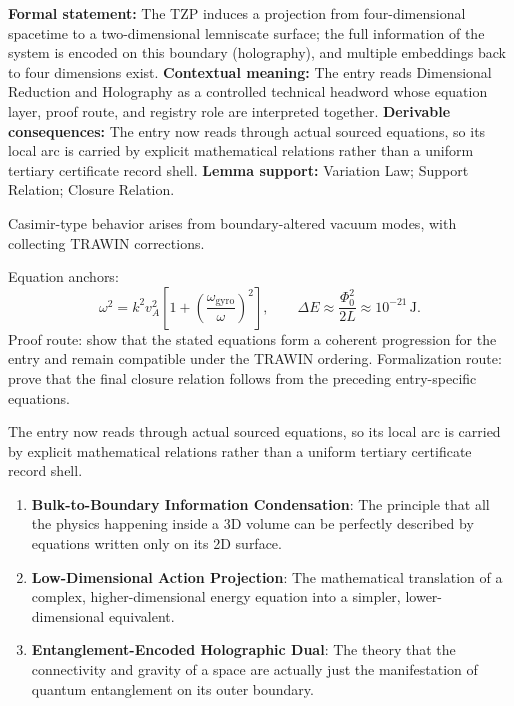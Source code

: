 \begingroup\footnotesize\setlength{\emergencystretch}{3em}\sloppy
\textbf{Formal statement:} The TZP induces a projection from four-dimensional spacetime to a two-dimensional lemniscate surface; the full information of the system is encoded on this boundary (holography), and multiple embeddings back to four dimensions exist. \textbf{Contextual meaning:} The entry reads Dimensional Reduction and Holography as a controlled technical headword whose equation layer, proof route, and registry role are interpreted together. \textbf{Derivable consequences:} The entry now reads through actual sourced equations, so its local arc is carried by explicit mathematical relations rather than a uniform tertiary certificate record shell. \textbf{Lemma support:} Variation Law; Support Relation; Closure Relation.\par
\endgroup

Casimir-type behavior arises from boundary-altered vacuum modes, with collecting TRAWIN corrections.

Equation anchors:
\[
\omega^2=k^2v_A^2\left[1+\left(\frac{\omega_{\mathrm{gyro}}}{\omega}\right)^2\right],
\qquad
\Delta E\approx\frac{\Phi_0^2}{2L}\approx10^{-21}\,\mathrm{J}.
\]
Proof route: show that the stated equations form a coherent progression for the entry and remain compatible under the TRAWIN ordering. Formalization route: prove that the final closure relation follows from the preceding entry-specific equations.

The entry now reads through actual sourced equations, so its local arc is carried by explicit mathematical relations rather than a uniform tertiary certificate record shell.
\endgroup

\begin{enumerate}[leftmargin=1.6em,itemsep=6pt,topsep=4pt]
\item \textbf{Bulk-to-Boundary Information Condensation}: The principle that all the physics happening inside a 3D volume can be perfectly described by equations written only on its 2D surface.
\item \textbf{Low-Dimensional Action Projection}: The mathematical translation of a complex, higher-dimensional energy equation into a simpler, lower-dimensional equivalent.
\item \textbf{Entanglement-Encoded Holographic Dual}: The theory that the connectivity and gravity of a space are actually just the manifestation of quantum entanglement on its outer boundary.
\end{enumerate}

